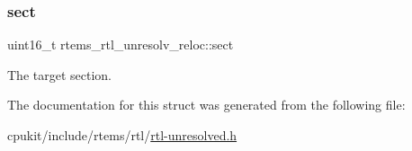 \subsubsection{\texorpdfstring{sect}{sect}}
{\footnotesize\ttfamily uint16\+\_\+t rtems\+\_\+rtl\+\_\+unresolv\+\_\+reloc\+::sect}

The target section. 

The documentation for this struct was generated from the following file\+:\begin{DoxyCompactItemize}
\item 
cpukit/include/rtems/rtl/\mbox{\hyperlink{rtl-unresolved_8h}{rtl-\/unresolved.\+h}}\end{DoxyCompactItemize}
